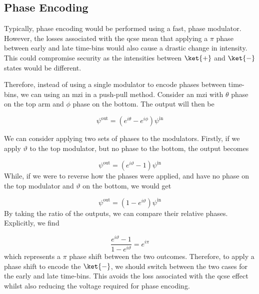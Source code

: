 \subsection{Phase Encoding}

Typically, phase encoding would be performed using a fast, phase modulator. However, the losses associated with the \ac{qcse} mean that applying a $\pi$ phase between early and late time-bins would also cause a drastic change in intensity. This could compromise security as the intensities between $\ket{+}$ and $\ket{-}$ states would be different. 

Therefore, instead of using a single modulator to encode phases between time-bins, we can using an \ac{mzi} in a push-pull method. Consider an \ac{mzi} with $\theta$ phase on the top arm and $\phi$ phase on the bottom. The output will then be 

\begin{equation}
	\psi^\mathrm{out} =  \left(e^{i\theta} - e^{i\phi}\right) \psi^\mathrm{in}
\end{equation}

We can consider applying two sets of phases to the modulators. Firstly, if we apply $\vartheta$ to the top modulator, but no phase to the bottom, the output becomes

\begin{equation}
	\psi^\mathrm{out} =  \left(e^{i\vartheta} -1\right) \psi^\mathrm{in}
\end{equation}
While, if we were to reverse how the phases were applied, and have no phase on the top modulator and $\vartheta$ on the bottom, we would get

\begin{equation}
	\psi^\mathrm{out} =  \left(1 - e^{i\vartheta}\right) \psi^\mathrm{in}
\end{equation}
By taking the ratio of the outputs, we can compare their relative phases. Explicitly, we find

\begin{equation}
	\frac{e^{i\vartheta} -1}{1 - e^{i\vartheta}} = e^{i\pi}
\end{equation}
which represents a $\pi$ phase shift between the two outcomes. Therefore, to apply a phase shift to encode the $\ket{-}$, we should switch between the two cases for the early and late time-bins. This avoids the loss associated with the \ac{qcse} effect whilst also reducing the voltage required for phase encoding.


